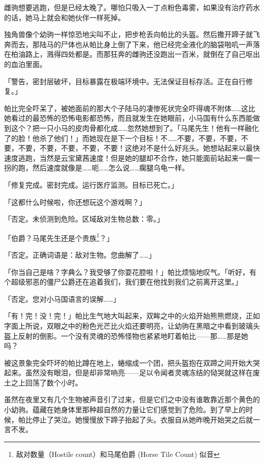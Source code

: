 雌驹想要逃跑，但是已经太晚了。哪怕只吸入一丁点粉色毒雾，如果没有治疗药水的话，她马上就会和她伙伴一样死掉。

独角兽像个幼驹一样惊恐地尖叫不止，把步枪丢向帕比的头盔。然后撒开蹄子就飞奔而去，那陆马的尸体也从帕比身上倒了下来，他已经完全液化的脑袋啪叽一声落在柏油路上，溅得四处都是。而那狂奔的雌驹还没跑出一百米，就倒在了自己呕出的血泊里面。

「{\mt 警告，密封层破坏，目标暴露在极端环境中。无法保证目标存活。正在自行修复。}」

帕比完全吓呆了，被她面前的那大个子陆马的凄惨死状完全吓得魂不附体……这比她看过的最恐怖的恐怖电影都恐怖，而且就发生在她眼前，小马国有什么东西能做到这个？把一只小马的皮肉骨都化成……忽然她想到了。「马尾先生！他有一样融化了的脸！他杀了他们！」而她现在是下一个目标！不……不要，不要，不要，不要，不要，不要，不要，不要，不要！这绝对不是什么好兆头。她想站起来以最快速度逃跑，当然是云宝黛茜速度！但是她的腿却不合作，她只能面前站起来一瘸一拐的跑，然后速度就像是……呃……怎么说……瘸腿乌龟一样。

「{\mt 修复完成。密封完成。运行医疗监测。目标已死亡。}」

「这都什么时候啦，你还想玩这个游戏啊？」

「{\mt 否定。未侦测到危险。区域敌对生物总数：零。}」

「伯爵？马尾先生还是个贵族\footnote{敌对数量（Hostile
  count）和马尾伯爵 (Horse Tile Count) 似音}？」

「{\mt 否定。正确词语是：敌对生物。您曲解了……}」

「你当自己是啥？字典么？我受够了你耍花腔啦！」帕比烦恼地叹气。「听好，有个超级邪恶的僵尸公爵还在追着我们，我们要在他找到我们之前离开这里。」

「{\mt 否定。您对小马国语言的误解……}」

「有！完！没！完！」帕比生气地大叫起来，双眸之中的火焰开始熊熊燃烧，正如字面上所说，双眼之中的粉色光芒比火焰还要明亮，让幼驹在黑暗之中看到玻璃头盔上反射的倒影。一个没有灵魂的恐怖怪物也紧紧地盯着帕比——那……那是她吗？

被这景象完全吓坏的帕比蹲在地上，蜷缩成一个团，把头盔抱在双蹄之间开始大哭起来。虽然没有眼泪，但是却非常响亮——足以令闻者灵魂冻结的恸哭就这样在废土之上回荡了数个小时。

\horizonline


虽然在夜里又有几个生物被声音引了过来，但是它们之中没有谁敢靠近那个黄色的小幼驹。蕴藏在她身体里那种超自然的力量让它们感觉到了危险。到了早上的时候，帕比停止了哭泣。她慢慢放下蹄子抬起了头。衣服自从她昨晚开始哭之后就一言不发。

